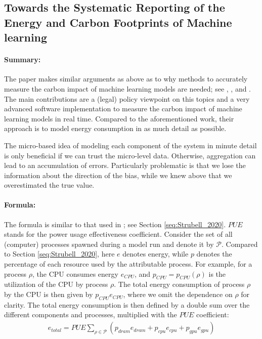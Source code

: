 \subsection{Towards the Systematic Reporting of the Energy and Carbon Footprints of
Machine learning}
\label{seq:Henderson_2020}
\centerline{}
\vspace{1em}

\paragraph{Summary:} The paper makes similar arguments as above as to why methods to
accurately measure the carbon impact of machine learning models are needed; see
, , and . The main
contributions are a (legal) policy viewpoint on this topics and a very advanced software
implementation to measure the carbon impact of machine learning models in real time.
Compared to the aforementioned work, their approach is to model energy consumption in as
much detail as possible.

The micro-based idea of modeling each component of the system in minute detail is only
beneficial if we can trust the micro-level data. Otherwise, aggregation can lead to an
accumulation of errors. Particularly problematic is that we lose the information about
the direction of the bias, while we knew above that we overestimated the true value.

\paragraph{Formula:} The formula is similar to that used in ; see
Section \ref{seq:Strubell_2020}. $PUE$ stands for the power usage effectiveness
coefficient. Consider the set of all (computer) processes spawned during a model run and
denote it by $\mathcal{P}$. Compared to Section \ref{seq:Strubell_2020}, here $e$
denotes energy, while $p$ denotes the percentage of each resource used by the
attributable process. For example, for a process $\rho$, the CPU consumes energy
$e_{CPU}$, and $p_{CPU} = p_{CPU}(\rho)$ is the utilization of the CPU by process
$\rho$. The total energy consumption of process $\rho$ by the CPU is then given by
$p_{CPU} e_{CPU}$, where we omit the dependence on $\rho$ for clarity. The total energy
consumption is then defined by a double sum over the different components and processes,
multiplied with the $PUE$ coefficient:
\begin{align}
    e_{total} = PUE \sum_{\rho \in \mathcal{P}} (p_{dram} e_{dram} + p_{cpu} e_{cpu} +
    p_{gpu} e_{gpu})
\end{align}

